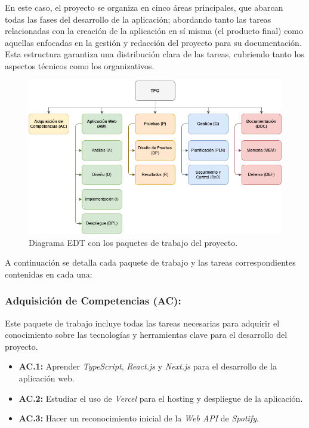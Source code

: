 En este caso, el proyecto se organiza en cinco áreas principales, que abarcan todas las fases del desarrollo de la aplicación; abordando tanto las tareas relacionadas con la creación de la aplicación en sí misma (el producto final) como aquellas enfocadas en la gestión y redacción del proyecto para su documentación. Esta estructura garantiza una distribución clara de las tareas, cubriendo tanto los aspectos técnicos como los organizativos.

\begin{figure}[H]
    \centering
    \includegraphics[width=\textwidth]{figures/edt.png}
    \caption{Diagrama EDT con los paquetes de trabajo del proyecto.}
    \label{fig:edt}
\end{figure}

A continuación se detalla cada paquete de trabajo y las tareas correspondientes contenidas en cada una:

\subsubsection{Adquisición de Competencias (AC):}

Este paquete de trabajo incluye todas las tareas necesarias para adquirir el conocimiento sobre las tecnologías y herramientas clave para el desarrollo del proyecto.

\begin{itemize}
    \item \textbf{AC.1:} Aprender \textit{TypeScript}, \textit{React.js} y \textit{Next.js} para el desarrollo de la aplicación web.
    \item \textbf{AC.2:} Estudiar el uso de \textit{Vercel} para el hosting y despliegue de la aplicación.
    \item \textbf{AC.3:} Hacer un reconocimiento inicial de la \textit{Web API} de \textit{Spotify}.
\end{itemize}

